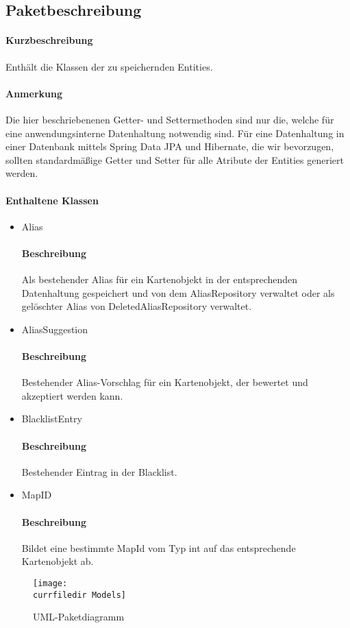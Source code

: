 \subsection{Paketbeschreibung}%
\paragraph*{Kurzbeschreibung}
    Enthält die Klassen der zu speichernden Entities.
\paragraph*{Anmerkung}  
    Die hier beschriebenenen Getter- und Settermethoden sind nur die, welche für eine anwendungsinterne Datenhaltung 
    notwendig sind. Für eine Datenhaltung in einer Datenbank mittels Spring Data JPA und Hibernate, die wir bevorzugen, sollten 
    standardmäßige Getter und Setter für alle Atribute der Entities generiert werden.
\paragraph*{Enthaltene Klassen}
\begin{itemize}
    \item Alias
    		\paragraph*{Beschreibung}
            Als bestehender Alias für ein Kartenobjekt in der entsprechenden Datenhaltung gespeichert und von 
            dem AliasRepository verwaltet oder als gelöschter Alias von DeletedAliasRepository verwaltet.
    \item AliasSuggestion
    		\paragraph*{Beschreibung}
          Bestehender Alias-Vorschlag für ein Kartenobjekt, der bewertet und akzeptiert werden kann.
    \item BlacklistEntry 
            \paragraph{Beschreibung}
          Bestehender Eintrag in der Blacklist.
    \item MapID
            \paragraph{Beschreibung} 
          Bildet eine bestimmte MapId vom Typ int auf das entsprechende Kartenobjekt ab.
\end{itemize}

\begin{figure}
  \centering
  \texttt{[image: \\currfiledir Models]}
  \caption{UML-Paketdiagramm}
\end{figure}